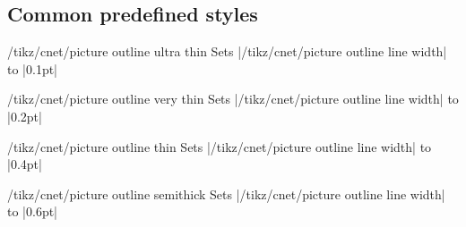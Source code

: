 \documentclass[a4paper]{ltxdoc}
\begin{document}
\subsection{Common predefined styles}
\label{sec:cnet-symbol-predefined-styles}

\begin{stylekey}{/tikz/cnet/picture outline ultra thin}
  Sets |/tikz/cnet/picture outline line width| to |0.1pt|
\begin{codeexample}[]
\end{codeexample}
\end{stylekey}

\begin{stylekey}{/tikz/cnet/picture outline very thin}
  Sets |/tikz/cnet/picture outline line width| to |0.2pt|
\begin{codeexample}[]
\end{codeexample}
\end{stylekey}

\begin{stylekey}{/tikz/cnet/picture outline thin}
  Sets |/tikz/cnet/picture outline line width| to |0.4pt|
\begin{codeexample}[]
\end{codeexample}
\end{stylekey}

\begin{stylekey}{/tikz/cnet/picture outline semithick}
  Sets |/tikz/cnet/picture outline line width| to |0.6pt|
\begin{codeexample}[]
\end{codeexample}
\end{stylekey}
\end{document}
